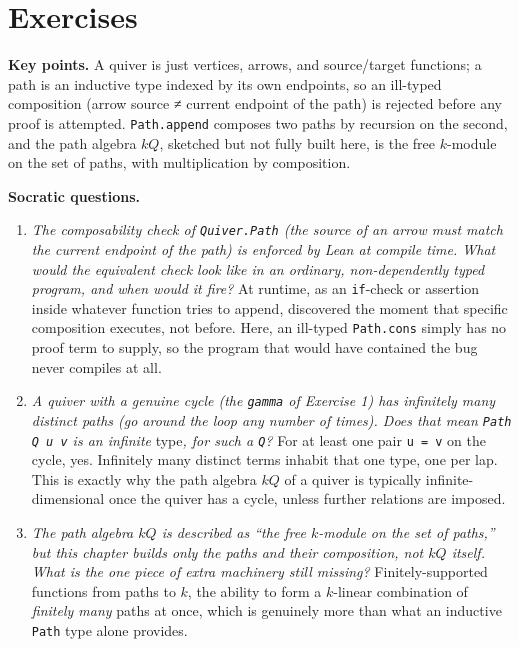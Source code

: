 \section{Exercises}\label{sec:11-path-algebras:06-exercises:1}

\textbf{Key points.} A quiver is just vertices, arrows, and source/target functions; a path is an inductive type indexed by its own endpoints, so an ill-typed composition (arrow source ≠ current endpoint of the path) is rejected before any proof is attempted. \texttt{Path.append} composes two paths by recursion on the second, and the path algebra \(kQ\), sketched but not fully built here, is the free \(k\)-module on the set of paths, with multiplication by composition.

\textbf{Socratic questions.}

\begin{enumerate}
\def\labelenumi{\arabic{enumi}.}
\item
  \emph{The composability check of \texttt{Quiver.Path} (the source of an arrow must match the current endpoint of the path) is enforced by Lean at compile time. What would the equivalent check look like in an ordinary, non-dependently typed program, and when would it fire?} At runtime, as an \texttt{if}-check or assertion inside whatever function tries to append, discovered the moment that specific composition executes, not before. Here, an ill-typed \texttt{Path.cons} simply has no proof term to supply, so the program that would have contained the bug never compiles at all.
\item
  \emph{A quiver with a genuine cycle (the \texttt{gamma} of Exercise 1) has infinitely many distinct paths (go around the loop any number of times). Does that mean \texttt{Path Q u v} is an infinite }type\emph{, for such a \texttt{Q}?} For at least one pair \texttt{u = v} on the cycle, yes. Infinitely many distinct terms inhabit that one type, one per lap. This is exactly why the path algebra \(kQ\) of a quiver is typically infinite-dimensional once the quiver has a cycle, unless further relations are imposed.
\item
  \emph{The path algebra \(kQ\) is described as ``the free \(k\)-module on the set of paths,'' but this chapter builds only the paths and their composition, not \(kQ\) itself. What is the one piece of extra machinery still missing?} Finitely-supported functions from paths to \(k\), the ability to form a \(k\)-linear combination of \emph{finitely many} paths at once, which is genuinely more than what an inductive \texttt{Path} type alone provides.

\end{enumerate}
